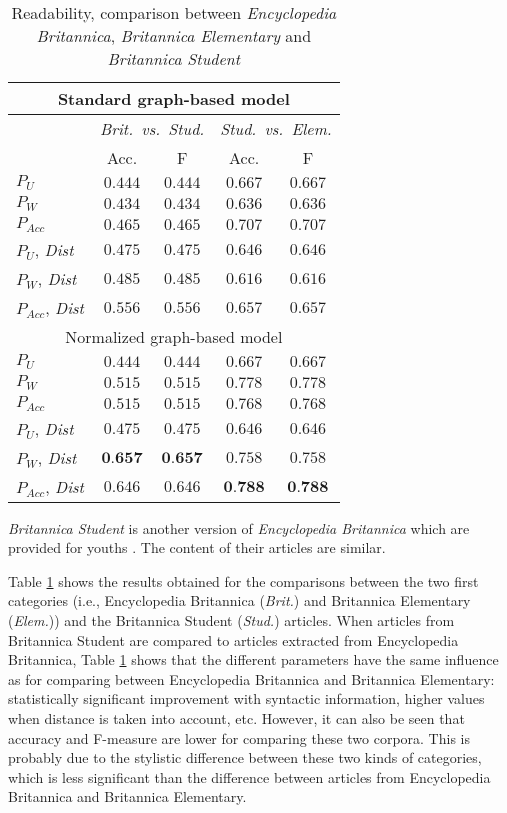\begin{table}[!t] 
 \centering
 \begin{tabular}{l|cc|cc} 
  \multicolumn{5}{c}{Standard graph-based model}\\\hline
  & \multicolumn{2}{|c}{\textit{Brit.\ vs.\ Stud.}} &
	\multicolumn{2}{|c}{\textit{Stud.\ vs.\ Elem.}}\\\hline 
  & Acc. & F & Acc. & F\\\hline
   $P_U$ & $0.444$ & $0.444$ & $0.667$ & $0.667$\\
   $P_W$ & $0.434$ & $0.434$ & $0.636$ & $0.636$\\ 
   $P_{Acc}$ & $0.465$ & $0.465$ & $0.707$ & $0.707$\\
   $P_U$, \textit{Dist} & $0.475$ & $0.475$ & $0.646$ & $0.646$\\
   $P_W$, \textit{Dist} & $0.485$ & $0.485$ & $0.616$ & $0.616$\\
   $P_{Acc}$, \textit{Dist} & $0.556$ & $0.556$ & $0.657$ & $0.657$\\\hline 
  
    \multicolumn{5}{c}{Normalized graph-based model}\\\hline
   $P_U$ & $0.444$ & $0.444$ & $0.667$ & $0.667$\\
   $P_W$ & $0.515$ & $0.515$ & $0.778$ & $0.778$\\ 
   $P_{Acc}$ & $0.515$ & $0.515$ & $0.768$ & $0.768$\\
   $P_U$, \textit{Dist} & $0.475$ & $0.475$ & $0.646$ & $0.646$\\
   $P_W$, \textit{Dist} & $\textbf{0.657}$ & $\textbf{0.657}$ & $0.758$ & $0.758$\\
   $P_{Acc}$, \textit{Dist} & $0.646$ & $0.646$ & $\textbf{0.788}$ & $\textbf{0.788}$\\
 \end{tabular}
 \caption{Readability, comparison between \emph{Encyclopedia Britannica}, \emph{Britannica Elementary} and \emph{Britannica Student}}
 \label{t:exp3:stu}
 \end{table}

\textit{Britannica Student} is another version of \textit{Encyclopedia Britannica} which are provided for youths \cite{guinaudeau13}. 
The content of their articles are similar.

Table \ref{t:exp3:stu} shows the results obtained for the comparisons between the two first categories (i.e., Encyclopedia Britannica (\textit{Brit.}) and Britannica Elementary (\textit{Elem.})) and the Britannica Student (\textit{Stud.}) articles. 
When articles from Britannica Student are compared to articles extracted from Encyclopedia Britannica, Table \ref{t:exp3:stu} shows that the different parameters have the same influence as for comparing between Encyclopedia Britannica and Britannica
Elementary: statistically significant improvement with syntactic information, higher values when distance is taken into account, etc.
However, it can also be seen that accuracy and F-measure are lower for comparing these two corpora. 
This is probably due to the stylistic difference between these two kinds of categories, which is less significant than the difference between articles from Encyclopedia Britannica and Britannica Elementary.

